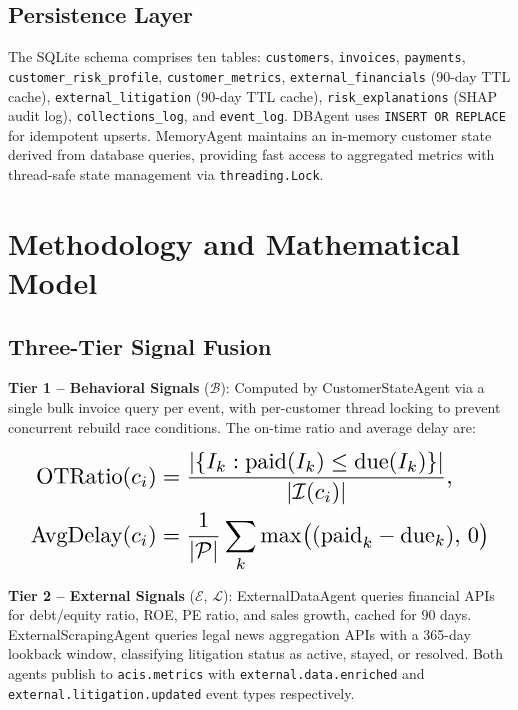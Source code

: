 \documentclass[runningheads]{llncs}
\begin{document}
\subsection{Persistence Layer}

The SQLite schema comprises ten tables: \texttt{customers}, \texttt{invoices}, \texttt{payments}, \texttt{customer\allowbreak \_risk\allowbreak \_profile}, \texttt{customer\_metrics}, \texttt{external\allowbreak \_financials} (90-day TTL cache), \texttt{external\allowbreak \_litigation} (90-day TTL cache), \texttt{risk\allowbreak \_explanations} (SHAP audit log), \texttt{collections\_log}, and \texttt{event\_log}. DBAgent uses \texttt{INSERT OR\allowbreak\ REPLACE} for idempotent upserts. MemoryAgent maintains an in-memory customer state derived from database queries, providing fast access to aggregated metrics with thread-safe state management via \texttt{threading.Lock}.

\section{Methodology and Mathematical Model}
\label{sec:methodology}

\subsection{Three-Tier Signal Fusion}

\textbf{Tier 1 -- Behavioral Signals} ($\mathcal{B}$): Computed by CustomerStateAgent via a single bulk invoice query per event, with per-customer thread locking to prevent concurrent rebuild race conditions. The on-time ratio and average delay are:

\begin{equation}
\resizebox{0.95\columnwidth}{!}{$
\begin{split}
\text{OTRatio}(c_i) &= \frac{|\{I_k : \text{paid}(I_k)\leq\text{due}(I_k)\}|}{|\mathcal{I}(c_i)|}, \\
\text{AvgDelay}(c_i) &= \frac{1}{|\mathcal{P}|}\sum_{k}\max\bigl((\text{paid}_k - \text{due}_k),\,0\bigr)
\end{split}
$}
\label{eq:behavioral}
\end{equation}

\textbf{Tier 2 -- External Signals} ($\mathcal{E}$, $\mathcal{L}$): ExternalDataAgent queries financial APIs for debt/equity ratio, ROE, PE ratio, and sales growth, cached for 90 days. ExternalScrapingAgent queries legal news aggregation APIs with a 365-day lookback window, classifying litigation status as active, stayed, or resolved. Both agents publish to \texttt{acis.metrics} with \texttt{external.\allowbreak data.\allowbreak enriched} and \texttt{external.\allowbreak litigation.\allowbreak updated} event types respectively.
\end{document}
